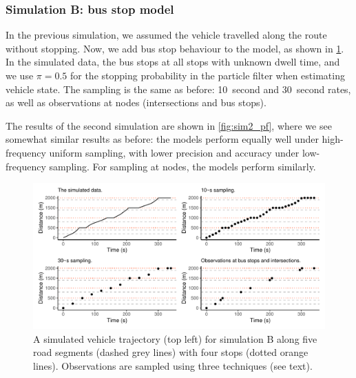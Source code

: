 \subsubsection{Simulation B: bus stop model}
\label{sec:vehicle_sim_B}

In the previous simulation, we assumed the vehicle travelled along the route without stopping. Now, we add bus stop behaviour to the model, as shown in \cref{fig:sim2_graph}. In the simulated data, the bus stops at all stops with unknown dwell time, and we use $\pi=0.5$ for the stopping probability in the particle filter when estimating vehicle state. The sampling is the same as before: 10~second and 30~second rates, as well as observations at nodes (intersections and bus stops).




\afterpage{\clearpage}

The results of the second simulation are shown in \cref{fig:sim2_pf}, where we see somewhat similar results as before: the models perform equally well under high-frequency uniform sampling, with lower precision and accuracy under low-frequency sampling. For sampling at nodes, the models perform similarly.

\begin{knitrout}\small
{}\color{fgcolor}\begin{figure}
\includegraphics[width=\linewidth]{figure/sim2_graph-1} \caption[Vehicle trajectory with sampled observations for simulation B]{A simulated vehicle trajectory (top left) for simulation B along five road segments (dashed grey lines) with four stops (dotted orange lines). Observations are sampled using three techniques (see text).}\label{fig:sim2_graph}
\end{figure}


\end{knitrout}

